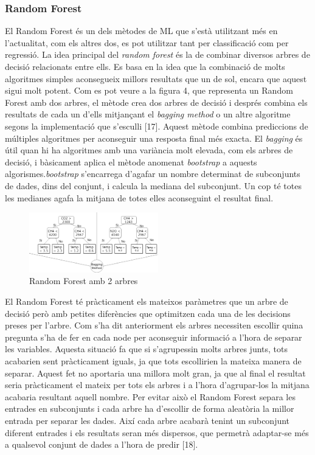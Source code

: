 \documentclass[10pt,a4paper,twocolumn,twoside]{article}
\begin{document}
\subsubsection{Random Forest}
El Random Forest és un dels mètodes de ML que s'està utilitzant més en l'actualitat, com els altres dos, es pot utilitzar tant per classificació com per regressió. La idea principal del \textit{random forest} és la de combinar diversos arbres de decisió relacionats entre ells. Es basa en la idea que la combinació de molts algoritmes simples aconsegueix millors resultats que un de sol, encara que aquest sigui molt potent. Com es pot veure a la figura 4, que representa un Random Forest amb dos arbres, el mètode crea dos arbres de decisió i després combina els resultats de cada un d'ells mitjançant el \textit{bagging method} o un altre algoritme segons la implementació que s'esculli [17]. Aquest mètode combina prediccions de múltiples algoritmes per aconseguir una resposta final més exacta. El \textit{bagging} és útil quan hi ha algoritmes amb una variància molt elevada, com els arbres de decisió, i bàsicament aplica el mètode anomenat \textit{bootstrap} a aquests algorismes.\textit{bootstrap} s'encarrega d'agafar un nombre determinat de subconjunts de dades, dins del conjunt, i calcula la mediana del subconjunt. Un cop té totes les medianes agafa la mitjana de totes elles aconseguint el resultat final.
\begin{figure}[!h]
\centering
	\includegraphics[width=0.5\textwidth]{../img/randomForest}
	\caption{Random Forest amb 2 arbres}
	\label{fig-RandomForest}
\end{figure}

El Random Forest té pràcticament els mateixos paràmetres que un arbre de decisió però amb petites diferències que optimitzen cada una de les decisions preses per l'arbre. Com s'ha dit anteriorment els arbres necessiten escollir quina pregunta s'ha de fer en cada node per aconseguir informació a l'hora de separar les variables. Aquesta situació fa que si s'agrupessin molts arbres junts, tots acabarien sent pràcticament iguals, ja que tots escollirien la mateixa manera de separar. Aquest fet no aportaria una millora molt gran, ja que al final el resultat seria pràcticament el mateix per tots els arbres i a l'hora d'agrupar-los la mitjana acabaria resultant aquell nombre. Per evitar això el Random Forest separa les entrades en subconjunts i cada arbre ha d'escollir de forma aleatòria la millor entrada per separar les dades. Així cada arbre acabarà tenint un subconjunt diferent entrades i els resultats seran més dispersos, que permetrà adaptar-se més a qualsevol conjunt de dades a l'hora de predir [18].
\end{document}
